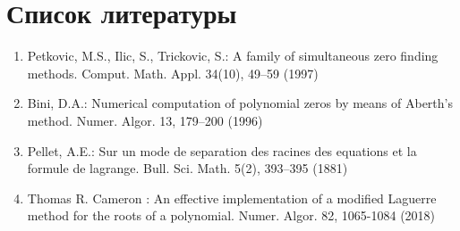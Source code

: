 \documentclass[a4paper,12pt]{article}
\begin{document}
\newpage
\section{Список литературы}
\begin{enumerate}
    \item Petkovic, M.S., Ilic, S., Trickovic, S.: A family of simultaneous zero finding methods. Comput. Math. Appl. 34(10), 49–59 (1997)
    \item Bini, D.A.: Numerical computation of polynomial zeros by means of Aberth’s method. Numer. Algor. 13, 179–200 (1996)
    \item Pellet, A.E.: Sur un mode de separation des racines des equations et la formule de lagrange. Bull. Sci. Math. 5(2), 393–395 (1881)
    \item Thomas R. Cameron : An effective implementation of a modified Laguerre
    method for the roots of a polynomial. Numer. Algor. 82, 1065-1084 (2018)
\end{enumerate}
\end{document}
